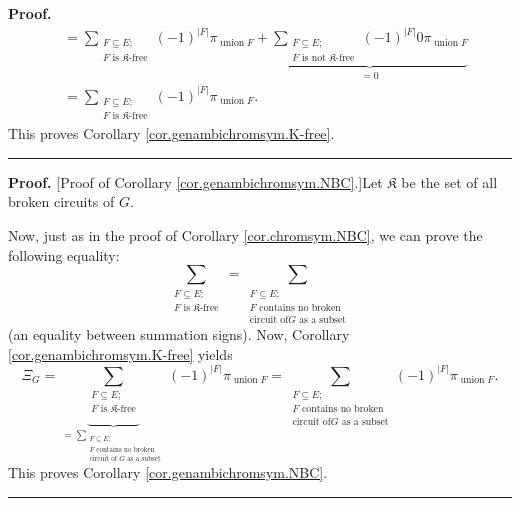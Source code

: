 \documentclass[numbers=enddot,12pt,final,onecolumn,notitlepage]{scrartcl}%
\theoremstyle{definition}
\newenvironment{proof}[1][Proof]{\noindent\textbf{#1.} }{\ \rule{0.5em}{0.5em}}
\newenvironment{verlong}{}{}
\let\sumnonlimits\sum
\renewcommand{\sum}{\sumnonlimits\limits}
\begin{document}
\begin{verlong}
\begin{proof}
\begin{align*}
&  =\sum_{\substack{F\subseteq E;\\F\text{ is }\mathfrak{K}\text{-free}%
}}\left(  -1\right)  ^{\left\vert F\right\vert }\pi_{\operatorname*{union}%
F}+\underbrace{\sum_{\substack{F\subseteq E;\\F\text{ is not }\mathfrak{K}%
\text{-free}}}\left(  -1\right)  ^{\left\vert F\right\vert }0\pi
_{\operatorname*{union}F}}_{=0}\\
&  =\sum_{\substack{F\subseteq E;\\F\text{ is }\mathfrak{K}\text{-free}%
}}\left(  -1\right)  ^{\left\vert F\right\vert }\pi_{\operatorname*{union}F}.
\end{align*}
This proves Corollary \ref{cor.genambichromsym.K-free}.
\end{proof}

\begin{proof}
[Proof of Corollary \ref{cor.genambichromsym.NBC}.]Let $\mathfrak{K}$ be the
set of all broken circuits of $G$.

Now, just as in the proof of Corollary \ref{cor.chromsym.NBC}, we can prove
the following equality:
\[
\sum_{\substack{F\subseteq E;\\F\text{ is }\mathfrak{K}\text{-free}}%
}=\sum_{\substack{F\subseteq E;\\F\text{ contains no broken}\\\text{circuit of
}G\text{ as a subset}}}
\]
(an equality between summation signs). Now, Corollary
\ref{cor.genambichromsym.K-free} yields%
\[
\Xi_{G}=\underbrace{\sum_{\substack{F\subseteq E;\\F\text{ is }\mathfrak{K}%
\text{-free}}}}_{=\sum_{\substack{F\subseteq E;\\F\text{ contains no
broken}\\\text{circuit of }G\text{ as a subset}}}}\left(  -1\right)
^{\left\vert F\right\vert }\pi_{\operatorname*{union}F}=\sum
_{\substack{F\subseteq E;\\F\text{ contains no broken}\\\text{circuit of
}G\text{ as a subset}}}\left(  -1\right)  ^{\left\vert F\right\vert }%
\pi_{\operatorname*{union}F}.
\]
This proves Corollary \ref{cor.genambichromsym.NBC}.
\end{proof}


\end{verlong}
\end{document}
